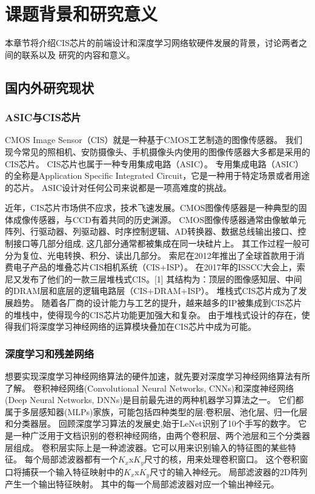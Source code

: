 
\chapter{课题背景和研究意义}

本章节将介绍CIS芯片的前端设计和深度学习网络软硬件发展的背景，讨论两者之间的联系以及
研究的内容和意义。

\section{国内外研究现状}

\subsection{ASIC与CIS芯片}
CMOS Image Sensor（CIS）就是一种基于CMOS工艺制造的图像传感器。
我们现今常见的照相机、安防摄像头、手机摄像头内使用的图像传感器大多都是采用的CIS芯片。
CIS芯片也属于一种专用集成电路（ASIC）。
专用集成电路（ASIC）的全称是Application Specific Integrated Circuit，它是一种用于特定场景或者用途的芯片。
ASIC设计对任何公司来说都是一项高难度的挑战。  

近年，CIS芯片市场供不应求，技术飞速发展。CMOS图像传感器是一种典型的固体成像传感器，与CCD有着共同的历史渊源。
CMOS图像传感器通常由像敏单元阵列、行驱动器、列驱动器、时序控制逻辑、AD转换器、数据总线输出接口、控制接口等几部分组成, 这几部分通常都被集成在同一块硅片上。
其工作过程一般可分为复位、光电转换、积分、读出几部分。  
索尼在2012年推出了全球首款用于消费电子产品的堆叠芯片CIS相机系统（CIS+ISP）。
在2017年的ISSCC大会上，索尼又发布了他们的一款三层堆栈式CIS。[1] %
其结构为：顶层的图像感知层、中间的DRAM层和底层的逻辑电路层（CIS+DRAM+ISP）。
堆栈式CIS芯片成为了发展趋势。
随着各厂商的设计能力与工艺的提升，越来越多的IP被集成到CIS芯片的堆栈中，使得现今的CIS芯片功能更加强大和复杂。
由于堆栈式设计的存在，使得我们将深度学习神经网络的运算模块叠加在CIS芯片中成为可能。  

\subsection{深度学习和残差网络}
想要实现深度学习神经网络算法的硬件加速，就先要对深度学习神经网络算法有所了解。
卷积神经网络(Convolutional Neural Networks, CNNs)和深度神经网络(Deep Neural Networks, DNNs)是目前最先进的两种机器学习算法之一。%
它们都属于多层感知器(MLPs)家族，可能包括四种类型的层:卷积层、池化层、归一化层和分类器层。%
回顾深度学习算法的发展史,始于LeNet识别了10个手写的数字。
它是一种广泛用于文档识别的卷积神经网络，由两个卷积层、两个池层和三个分类器层组成。
卷积层实际上是一种滤波器。它可以用来识别输入的特征图的某些特征。
每个局部滤波器都有一个$K_x$x$K_y$尺寸的核，用来处理卷积窗口。
这个卷积窗口将捕获一个输入特征映射中的$K_x$x$K_y$尺寸的输入神经元。
局部滤波器的2D阵列产生一个输出特征映射。
其中的每一个局部滤波器对应一个输出神经元。

